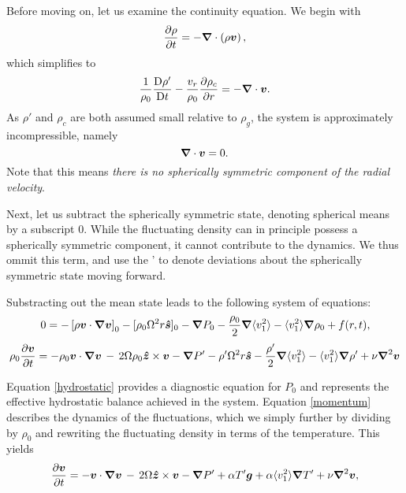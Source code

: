 Before moving on, let us examine the continuity equation.   We begin with
\begin{equation}
\frac{\partial \rho}{\partial t} = -\boldsymbol{\nabla}\cdot\left(\rho\boldsymbol{v}\right),
\end{equation}
which simplifies to 
\begin{equation}
\frac{1}{\rho_0}\frac{\mathrm{D}\rho'}{\mathrm{D}t}-\frac{v_r}{\rho_0}\frac{\partial \rho_c}{\partial r} = -\boldsymbol{\nabla}\cdot\boldsymbol{v}.
\end{equation}
As $\rho'$ and $\rho_c$ are both assumed small relative to $\rho_g$, the system is approximately incompressible, namely
\begin{equation}
\boldsymbol{\nabla}\cdot\boldsymbol{v} = 0.
\end{equation}
Note that this means {\em there is no spherically symmetric component of the radial velocity}.

Next, let us subtract the spherically symmetric state, denoting spherical means by a subscript 0.   While the fluctuating density can in principle possess a spherically symmetric component, it cannot contribute to the dynamics. We thus ommit this term, and use the ' to denote deviations about the spherically symmetric state moving forward.

Substracting out the mean state leads to the following system of equations:
\begin{equation}
\label{hydrostatic}
0   =  - \left[\rho\vvec\cdot\boldsymbol{\nabla}\vvec\right]_0
- [\rho_0\Omega^2r\boldsymbol{\hat{s}}]_0
-\boldsymbol{\nabla}P_0  %
						        - \frac{\rho_0}{2}\boldsymbol{\nabla}\langle v_1^2\rangle
							- \langle v_1^2\rangle\boldsymbol{\nabla}\rho_0
							+ f(r,t),
\end{equation}
\begin{equation}
\label{momentum}
\rho_0\frac{ \partial \vvec }{\partial t}   =  - \rho_0\vvec\cdot\boldsymbol{\nabla}\vvec
\,-\, 2\Omega\rho_0\boldsymbol{\hat{z}}\times\vvec  
-\boldsymbol{\nabla}P'  %
-\rho'\Omega^2r\boldsymbol{\hat{s}}
						        - \frac{\rho'}{2}\boldsymbol{\nabla}\langle v_1^2\rangle
							- \langle v_1^2\rangle\boldsymbol{\nabla}\rho'
+ \nu\boldsymbol{\nabla}^2\vvec
\end{equation}

Equation \ref{hydrostatic} provides a diagnostic equation for $P_0$ and represents the effective hydrostatic balance achieved in the system.  Equation \ref{momentum} describes the dynamics of the fluctuations, which we simply further by dividing by $\rho_0$ and rewriting the fluctuating density in terms of the temperature.  This yields
\begin{equation}
\frac{ \partial \vvec }{\partial t}   =  - \vvec\cdot\boldsymbol{\nabla}\vvec
\,-\, 2\Omega\boldsymbol{\hat{z}}\times\vvec  
-\boldsymbol{\nabla}P'  %
						        + \alpha T' \boldsymbol{g}
							+\alpha \langle v_1^2\rangle\boldsymbol{\nabla} T'
+ \nu\boldsymbol{\nabla}^2\vvec,
\end{equation}

